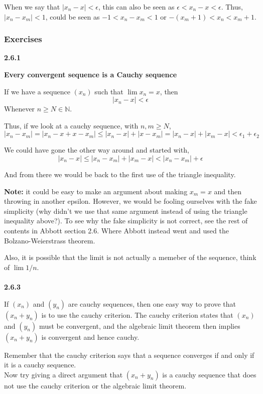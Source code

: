 When we say that $|x_n - x| < \epsilon$, this can also be seen as $\epsilon < x_n - x < \epsilon$.
Thus, $|x_n - x_m| < 1$, could be seen as $-1 < x_n - x_m < 1$ or $-(x_m + 1) < x_n < x_m + 1$.


\subsubsection{Exercises}

\textbf{2.6.1}

\textbf{Every convergent sequence is a Cauchy sequence}

If we have a sequence $(x_n)$ such that $\lim x_n = x$, then
$$
|x_n - x| < \epsilon
$$
Whenever $n \geq N \in \mathbb{N}$.

Thus, if we look at a cauchy sequence, with $n, m \geq N$,
$$
|x_n - x_m| = |x_n - x + x - x_m| \leq |x_n - x| + |x - x_m| = |x_n - x| + |x_m - x| < \epsilon_1 + \epsilon_2
$$

We could have gone the other way around and started with,
$$
|x_n - x| \leq |x_n - x_m| + |x_m - x| < |x_n - x_m| + \epsilon
$$

And from there we would be back to the first use of the triangle inequality.

\textbf{Note:} it could be easy to make an argument about making $x_m = x$ and then throwing in another
epsilon. However, we would be fooling ourselves with the fake simplicity (why didn't we use that same
argument instead of using the triangle inequality above?).
To see why the fake simplicity is not correct, see the rest of contents in Abbott section 2.6.
Where Abbott instead went and used the Bolzano-Weierstrass theorem.

Also, it is possible that the limit is not actually a memeber of the sequence, think of $\lim 1/n$.
\\~\\



\textbf{2.6.3}

If $(x_n)$ and $(y_n)$ are cauchy sequences, then one easy way to prove that $(x_n + y_n)$ is
to use the cauchy criterion.
The cauchy criterion states that $(x_n)$ and $(y_n)$ must be convergent,
and the algebraic limit theorem then implies $(x_n + y_n)$ is convergent and hence cauchy.

Remember that the cauchy criterion says that a sequence converges if and only if it is a cauchy sequence.
\\

Now try giving a direct argument that $(x_n + y_n)$ is a cauchy sequence that does not use the
cauchy criterion or the algebraic limit theorem.
\\

